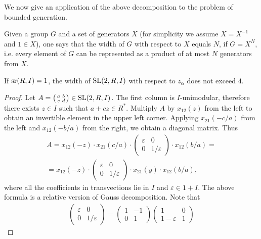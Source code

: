 We now give an application of the above decomposition to the problem of bounded generation.
\begin{dfn}
Given a group $G$ and a set of generators $X$ (for simplicity we assume $X=X^{-1}$ and $1\in X$), one says that the width of $G$ with respect to $X$ equals $N$, if $G=X^N$, i.e. every element of $G$ can be represented as a product of at most $N$ generators from $X$.
\end{dfn}
\begin{lemma}\label{lemma:srRI1}
If $\operatorname{sr}(R,I)=1$, the width of $\operatorname{SL}(2,R,I)$ with respect to $z_\alpha$ does not exceed $4$.
\end{lemma}
\begin{proof}
Let $A=\begin{psmallmatrix}a & b \\ c & d\end{psmallmatrix}\in\operatorname{SL}(2,R,I)$. The first column is $I$-unimodular, therefore there exists $z\in I$ such that $a+cz\in R^*$. Multiply $A$ by $x_{12}(z)$ from the left to obtain an invertible element in the upper left corner. Applying $x_{21}(-c/a)$ from the left and $x_{12}(-b/a)$ from the right, we obtain a diagonal matrix. Thus
\begin{multline*}
A=x_{12}(-z)\cdot x_{21}(c/a)\cdot
\begin{pmatrix} \varepsilon & 0 \\ 0 & 1/\varepsilon \end{pmatrix}
\cdot x_{12}(b/a)=\\
=x_{12}(-z)\cdot
\begin{pmatrix} \varepsilon & 0 \\ 0 & 1/\varepsilon \end{pmatrix}
\cdot x_{21}(y) \cdot x_{12}(b/a),
\end{multline*}
where all the coefficients in transvections lie in $I$ and $\varepsilon\in 1+I$. The above formula is a relative version of Gauss decomposition.
Note that
\begin{multline*}
\begin{pmatrix} \varepsilon & 0 \\ 0 & 1/\varepsilon \end{pmatrix} =
\begin{pmatrix} 1 & -1 \\ 0 & 1 \end{pmatrix}
\begin{pmatrix} 1 & 0 \\ 1-\varepsilon & 1 \end{pmatrix}

\end{multline*}
\end{proof}
